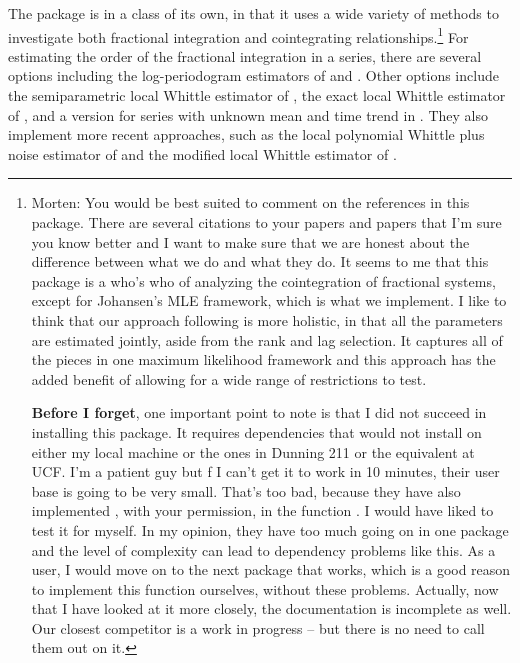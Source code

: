 \documentclass[article]{jss}
\newcommand{\fct}[1]{\code{#1()}}
\begin{document}
The package  is in a class of its own, in that it uses a wide variety of methods to investigate both fractional integration and cointegrating relationships.\footnote{Morten: You would be best suited to comment on the references in this package. 
There are several citations to your papers and papers that I'm sure you know better and I want to make sure that we are honest about the difference between what we do and what they do. 
It seems to me that this package is a who's who of analyzing the cointegration of fractional systems, except for Johansen's MLE framework, which is what we implement.
I like to think that our approach following \citet{Johansen1995} is more holistic, in that all the parameters are estimated jointly, aside from the rank and lag selection. 
It captures all of the pieces in one maximum likelihood framework and this approach has the added benefit of allowing for a wide range of restrictions to test. 

\textbf{Before I forget}, one important point to note is that I did not succeed in installing this package. 
It requires dependencies that would not install on either my local machine or the ones in Dunning 211 or the equivalent at UCF. 
I'm a patient guy but f I can't get it to work in 10 minutes, their user base is going to be very small. 
That's too bad, because they have also implemented \cite{Jensen2014}, with your permission, in the function \fct{fdiff}. I would have liked to test it for myself. 
In my opinion, they have too much going on in one package and the level of complexity can lead to dependency problems like this. 
As a user, I would move on to the next package that works, which is a good reason to implement this function ourselves, without these problems. 
Actually, now that I have looked at it more closely, the documentation is incomplete as well. 
Our closest competitor is a work in progress -- but there is no need to call them out on it. } 
% 
For estimating the order of the fractional integration in a series, there are several options including the log-periodogram estimators of \citet{GPH1983} and \citet{RobinsonPM1995b}. 
% 
Other options include the semiparametric local Whittle estimator of \citet{RobinsonPM1995a},
the exact local Whittle estimator of \citet{ShimotsuPhillips2005}, 
and a version for series with unknown mean and time trend in \citet{Shimotsu2010}. 
They also implement more recent approaches, such as 
the local polynomial Whittle plus noise estimator of \citet{FredNielsenNielsen2012} 
and the modified local Whittle estimator of \citet{HouPerron2014}. 
\end{document}
